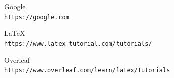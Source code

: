 \documentclass{article}
\begin{document}
\newpage
\newpage
\begin{thebibliography}{9}
Google
\\\texttt{https://google.com}

\LaTeX\
\\\texttt{https://www.latex-tutorial.com/tutorials/}
 
Overleaf
\\\texttt{https://www.overleaf.com/learn/latex/Tutorials}
\end{thebibliography}
\end{document}
